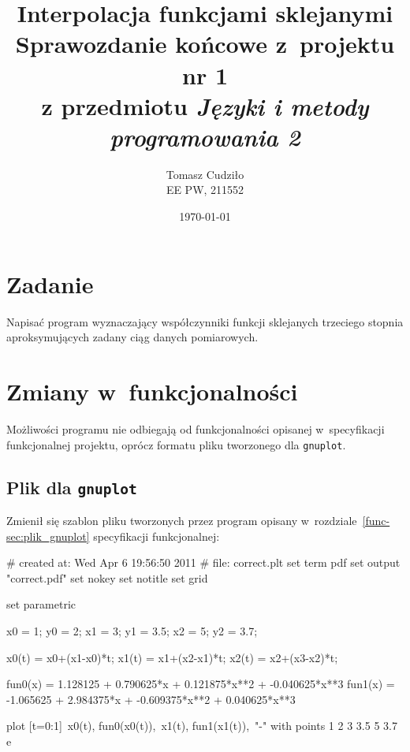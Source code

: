 \documentclass[10pt,a4paper]{article}
\begin{document}
\title{ 
  Interpolacja funkcjami sklejanymi\\
  {\normalsize Sprawozdanie końcowe z~projektu nr 1}\\\vspace{-12pt}
  {\normalsize z przedmiotu \emph{Języki i metody programowania 2}}
}
\author{
  Tomasz Cudziło\\
  {\small EE PW, 211552}
}
\date{\today}
\maketitle

\section*{Zadanie}
\label{sec:zadanie}

Napisać program wyznaczający współczynniki funkcji sklejanych trzeciego stopnia
aproksymujących zadany ciąg danych pomiarowych.

\vspace{24pt}

\section{Zmiany w~funkcjonalności}
Możliwości programu nie odbiegają od funkcjonalności opisanej w~specyfikacji
funkcjonalnej projektu, oprócz formatu pliku tworzonego dla {\tt gnuplot}.

\subsection{Plik dla \texttt{gnuplot}}
Zmienił się szablon pliku tworzonych przez program opisany
w~rozdziale~\ref{func-sec:plik_gnuplot} specyfikacji funkcjonalnej:
\begin{SmallVerbatim}
    # created at: Wed Apr  6 19:56:50 2011
    #       file: correct.plt
    set term pdf
    set output "correct.pdf"
    set nokey
    set notitle
    set grid

    set parametric

    x0 = 1; y0 = 2;
    x1 = 3; y1 = 3.5;
    x2 = 5; y2 = 3.7;

    x0(t) = x0+(x1-x0)*t;
    x1(t) = x1+(x2-x1)*t;
    x2(t) = x2+(x3-x2)*t;

    fun0(x) =   1.128125 +   0.790625*x +   0.121875*x**2 +  -0.040625*x**3
    fun1(x) =  -1.065625 +   2.984375*x +  -0.609375*x**2 +   0.040625*x**3

    plot [t=0:1]\
      x0(t), fun0(x0(t)),\
      x1(t), fun1(x1(t)),\
      "-" with points
        1 2
        3 3.5
        5 3.7
      e
\end{SmallVerbatim}
\end{document}
